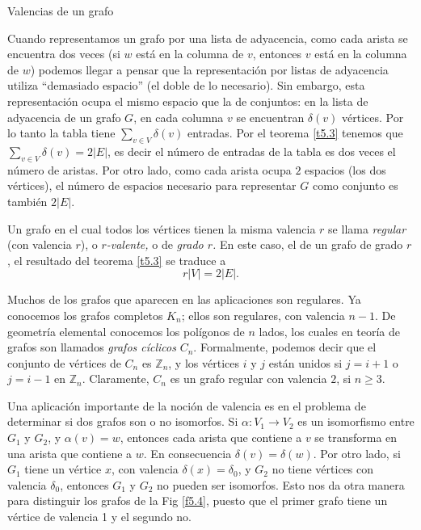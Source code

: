 \begin{section}{Valencias de un grafo}
\begin{observacion*}
    Cuando representamos un grafo por una lista de adyacencia, como cada arista se encuentra dos veces (si $w$ está en la columna de $v$,  entonces $v$  está en la columna de $w$) podemos llegar a pensar que la representación por listas de adyacencia utiliza ``demasiado espacio'' (el doble de lo necesario). Sin embargo,  esta representación ocupa el mismo espacio que la de conjuntos: en la  lista de adyacencia de un grafo $G$, en cada columna $v$  se encuentran $\delta(v)$ vértices. Por lo tanto la tabla tiene $\sum_{v \in V} \delta(v)$  entradas. Por el teorema \ref{t5.3} tenemos que $\sum_{v \in V} \delta(v)= 2|E|$,  es decir el número de entradas de la tabla es dos veces el número de aristas. Por otro lado, como cada arista ocupa $2$ espacios (los dos vértices),  el número de espacios necesario para representar $G$  como conjunto  es también $2|E|$. 
\end{observacion*}

Un grafo en el cual todos los vértices tienen la misma valencia $r$ se llama \textit{regular}   (con valencia $r$), o \textit{$r$-valente,} o de \textit{grado $r$.} En este caso, el de un grafo de grado $r $, el resultado del teorema \ref{t5.3} se traduce a
$$
r|V|=2|E|.
$$

Muchos de los grafos que aparecen en las aplicaciones son regulares. Ya conocemos los  grafos completos $K_n$; ellos son regulares, con valencia $n-1$. De geometría elemental conocemos los polígonos de $n$ lados, los cuales en teoría de grafos son llamados \textit{{grafos cíclicos}}   $C_n$. Formalmente, podemos decir que el conjunto de vértices de $C_n$ es $\mathbb Z_n$, y los vértices $i$ y $j$ están unidos si $j=i+1$ o $j=i-1$ en $\mathbb Z_n$. Claramente, $C_n$ es un grafo regular con valencia $2$, si $n\ge 3$.

Una aplicación importante de la noción de valencia es en el problema de determinar si dos grafos son o no isomorfos. Si $\alpha:V_1 \to  V_2$ es un isomorfismo entre $G_1$ y $G_2$, y $\alpha(v)=w$, entonces cada arista que contiene a $v$ se transforma en una arista que contiene a $w$. En consecuencia $\delta(v)=\delta(w)$. Por otro lado, si $G_1$ tiene un vértice $x$, con valencia $\delta(x)=\delta_0$, y $G_2$ no tiene vértices con valencia $\delta_0$, entonces $G_1$ y $G_2$ no pueden ser isomorfos. Esto nos da otra manera para distinguir los grafos de la Fig \ref{f5.4}, puesto que el primer grafo tiene un vértice de valencia 1 y el segundo no.


\end{section}
